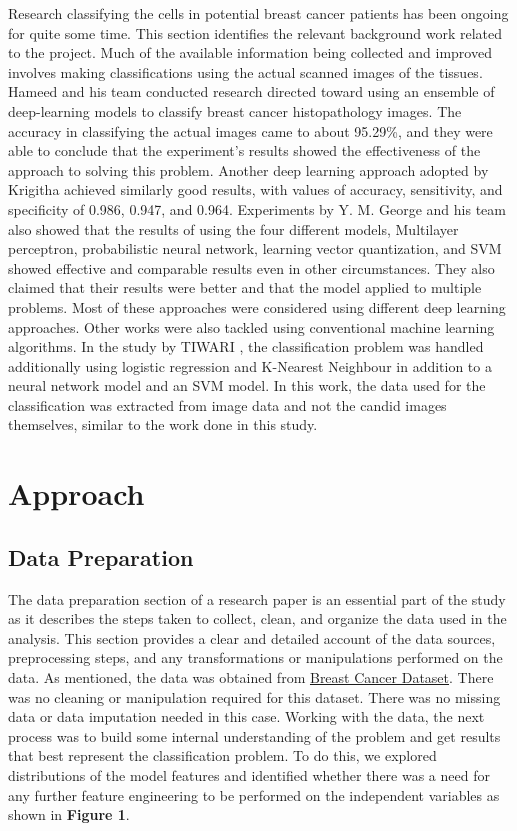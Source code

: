 \documentclass[10pt,twocolumn,letterpaper]{article}
\begin{document}
Research classifying the cells in potential breast cancer patients has been ongoing for quite some time. This section identifies the relevant background work related to the project. Much of the available information being collected and improved involves making classifications using the actual scanned images of the tissues. Hameed and his team conducted research directed toward using an ensemble of deep-learning models to classify breast cancer histopathology images. \cite{Hameed} The accuracy in classifying the actual images came to about 95.29\%, and they were able to conclude that the experiment's results showed the effectiveness of the approach to solving this problem. Another deep learning approach adopted by Krigitha achieved similarly good results, with values of accuracy, sensitivity, and specificity of 0.986, 0.947, and 0.964. \cite{Krigitha}
Experiments by Y. M. George and his team also showed that the results of using the four different models, Multilayer perceptron, probabilistic neural network, learning vector quantization, and SVM showed effective and comparable results even in other circumstances. \cite{George} They also claimed that their results were better and that the model applied to multiple problems.
Most of these approaches were considered using different deep learning approaches. Other works were also tackled using conventional machine learning algorithms. In the study by TIWARI \cite{TIWARI}, the classification problem was handled additionally using logistic regression and K-Nearest Neighbour in addition to a neural network model and an SVM model. In this work, the data used for the classification was extracted from image data and not the candid images themselves, similar to the work done in this study.


\section{Approach}
\label{sec:Approach}
\subsection{Data Preparation}

The data preparation section of a research paper is an essential part of the study as it describes the steps taken to collect, clean, and organize the data used in the analysis. This section provides a clear and detailed account of the data sources, preprocessing steps, and any transformations or manipulations performed on the data. As mentioned, the data was obtained from \href{http://archive.ics.uci.edu/ml/datasets/Breast+Cancer+Wisconsin+\%28Diagnostic\%29}{Breast Cancer Dataset}. There was no cleaning or manipulation required for this dataset. There was no missing data or data imputation needed in this case.
Working with the data, the next process was to build some internal understanding of the problem and get results that best represent the classification problem. To do this, we explored distributions of the model features and identified whether there was a need for any further feature engineering to be performed on the independent variables as shown in \textbf{Figure 1}.
\end{document}
